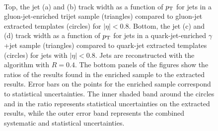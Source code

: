 \begin{figure}[p]
\begin{center}
 \\
\caption{Top, the jet (a) \ntrk and (b) track width as a function of $p_{\text{T}}$ for jets in a
gluon-jet-enriched trijet sample (triangles) compared to gluon-jet extracted templates (circles) for
$|\eta|<0.8$. Bottom, the jet (c) \ntrk and (d) track width as a function of $p_{\text{T}}$ for jets in a quark-jet-enriched $\gamma$+jet
sample (triangles) compared to quark-jet extracted templates (circles) for jets with $|\eta|<0.8$.
Jets are reconstructed with the \antikt algorithm with $R=0.4$. The bottom
panels of the figures show the ratios of the results found in the enriched sample to the extracted
results. Error bars on
the points for the enriched sample correspond to statistical uncertainties. The inner
shaded band around the circles and in the ratio represents statistical uncertainties on the
extracted results, while the outer error band represents the combined systematic and statistical
uncertainties.
}
\label{fig:jet-reconstruction:qg:pure_trijet_ntrkTrkWidth}
\end{center}
\end{figure}

